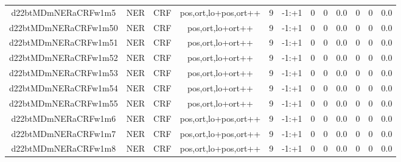 \documentclass[a4paper]{article}
\begin{document}
\begin{landscape}
\begin{center}
\begin{tabular}{ |c|c|c|c|c|c|c|c|c|c|c|c|}
 
 	
 	\small{ d22btMDmNERaCRFw1m5 } & \small{ NER} & \small{  CRF }  & pos,ort,lo+pos,ort++  &  9 &  \small{  -1:+1 }  &  0 & 0 & 0.0  &  0 & 0 & 0.0 \\
 	

 
 	
 	\small{ d22btMDmNERaCRFw1m50 } & \small{ NER} & \small{  CRF }  & pos,ort,lo+ort++  &  9 &  \small{  -1:+1 }  &  0 & 0 & 0.0  &  0 & 0 & 0.0 \\
 	

 
 	
 	\small{ d22btMDmNERaCRFw1m51 } & \small{ NER} & \small{  CRF }  & pos,ort,lo+ort++  &  9 &  \small{  -1:+1 }  &  0 & 0 & 0.0  &  0 & 0 & 0.0 \\
 	

 
 	
 	\small{ d22btMDmNERaCRFw1m52 } & \small{ NER} & \small{  CRF }  & pos,ort,lo+ort++  &  9 &  \small{  -1:+1 }  &  0 & 0 & 0.0  &  0 & 0 & 0.0 \\
 	

 
 	
 	\small{ d22btMDmNERaCRFw1m53 } & \small{ NER} & \small{  CRF }  & pos,ort,lo+ort++  &  9 &  \small{  -1:+1 }  &  0 & 0 & 0.0  &  0 & 0 & 0.0 \\
 	

 
 	
 	\small{ d22btMDmNERaCRFw1m54 } & \small{ NER} & \small{  CRF }  & pos,ort,lo+ort++  &  9 &  \small{  -1:+1 }  &  0 & 0 & 0.0  &  0 & 0 & 0.0 \\
 	

 
 	
 	\small{ d22btMDmNERaCRFw1m55 } & \small{ NER} & \small{  CRF }  & pos,ort,lo+ort++  &  9 &  \small{  -1:+1 }  &  0 & 0 & 0.0  &  0 & 0 & 0.0 \\
 	

 
 	
 	\small{ d22btMDmNERaCRFw1m6 } & \small{ NER} & \small{  CRF }  & pos,ort,lo+pos,ort++  &  9 &  \small{  -1:+1 }  &  0 & 0 & 0.0  &  0 & 0 & 0.0 \\
 	

 
 	
 	\small{ d22btMDmNERaCRFw1m7 } & \small{ NER} & \small{  CRF }  & pos,ort,lo+pos,ort++  &  9 &  \small{  -1:+1 }  &  0 & 0 & 0.0  &  0 & 0 & 0.0 \\
 	

 
 	
 	\small{ d22btMDmNERaCRFw1m8 } & \small{ NER} & \small{  CRF }  & pos,ort,lo+pos,ort++  &  9 &  \small{  -1:+1 }  &  0 & 0 & 0.0  &  0 & 0 & 0.0 \\
 	


\end{tabular}
\end{center}
\end{landscape}
\end{document}
